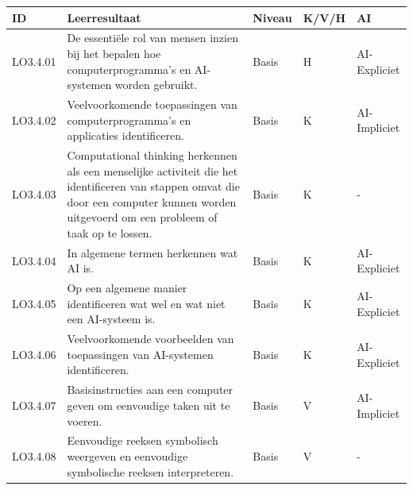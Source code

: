 \documentclass[
  dutch,
  letterpaper,
  DIV=11,
  numbers=noendperiod]{scrartcl}
\begin{document}
\begin{longtable}[]{@{}
  >{\centering\arraybackslash}p{}
  >{\centering\arraybackslash}p{}
  >{\centering\arraybackslash}p{}
  >{\centering\arraybackslash}p{}
  >{\centering\arraybackslash}p{}@{}}
\toprule\noalign{}
\begin{minipage}[b]{\linewidth}\centering
ID
\end{minipage} & \begin{minipage}[b]{\linewidth}\centering
Leerresultaat
\end{minipage} & \begin{minipage}[b]{\linewidth}\centering
Niveau
\end{minipage} & \begin{minipage}[b]{\linewidth}\centering
K/V/H
\end{minipage} & \begin{minipage}[b]{\linewidth}\centering
AI
\end{minipage} \\
\midrule\noalign{}
\endhead
\bottomrule\noalign{}
\endlastfoot
LO3.4.01 & De essentiële rol van mensen inzien bij het bepalen hoe
computerprogramma's en AI-systemen worden gebruikt. & Basis & H &
AI-Expliciet \\
LO3.4.02 & Veelvoorkomende toepassingen van computerprogramma's en
applicaties identificeren. & Basis & K & AI-Impliciet \\
LO3.4.03 & Computational thinking herkennen als een menselijke
activiteit die het identificeren van stappen omvat die door een computer
kunnen worden uitgevoerd om een probleem of taak op te lossen. & Basis &
K & - \\
LO3.4.04 & In algemene termen herkennen wat AI is. & Basis & K &
AI-Expliciet \\
LO3.4.05 & Op een algemene manier identificeren wat wel en wat niet een
AI-systeem is. & Basis & K & AI-Expliciet \\
LO3.4.06 & Veelvoorkomende voorbeelden van toepassingen van AI-systemen
identificeren. & Basis & K & AI-Expliciet \\
LO3.4.07 & Basisinstructies aan een computer geven om eenvoudige taken
uit te voeren. & Basis & V & AI-Impliciet \\
LO3.4.08 & Eenvoudige reeksen symbolisch weergeven en eenvoudige
symbolische reeksen interpreteren. & Basis & V & - \\

\end{longtable}
\end{document}
